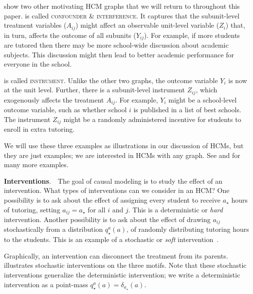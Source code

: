 \documentclass[12pt]{article}
\newcommand{\parhead}[1]{\vspace{0.1in} \noindent \textbf{#1}. \,\,}
\begin{document}
 
 show two other motivating HCM graphs that we will return to throughout this paper.  is called \textsc{confounder \& interference}. It captures that the subunit-level treatment variables ($A_{ij}$) might affect an observable unit-level variable ($Z_i$) that, in turn, affects the outcome of all subunits ($Y_{ij}$). For example, if more students are tutored then there may be more school-wide discussion about academic subjects. This discussion might then lead to better academic performance for everyone in the school.





 is called \textsc{instrument}. Unlike the other two graphs, the outcome variable $Y_i$ is now at the unit level. Further, there is a subunit-level instrument $Z_{ij}$, which exogenously affects the treatment $A_{ij}$. For example, $Y_i$ might be a school-level outcome variable, such as whether school $i$ is published in a list of best schools. The instrument $Z_{ij}$ might be a randomly administered incentive for students to enroll in extra tutoring.





We will use these three examples as illustrations in our discussion of HCMs, but they are just examples;
we are interested in HCMs with any graph. See  and  for many more examples.

\parhead{Interventions} The goal of causal modeling is to study the effect of an intervention. What types of interventions can we consider in an HCM?  One possibility is to ask about the effect of assigning every student to receive $a_\star$ hours of tutoring, setting $a_{ij} = a_\star$ for all $i$ and $j$.  This is a deterministic or \textit{hard} intervention. Another possibility is to ask about the effect of drawing $a_{ij}$ stochastically from a distribution $q_\star^a(a)$, of randomly distributing tutoring hours to the students.  This is an example of a stochastic or \textit{soft} intervention~\citep[Chap. 4][]{Pearl2009-fh,Dawid2002-yq,Correa2020-df}.



Graphically, an intervention can disconnect the treatment from its parents.  illustrates stochastic interventions on the three motifs.  Note that these stochastic interventions generalize the deterministic intervention; we write a deterministic intervention as a point-mass $q_\star^a(a) = \delta_{a_\star}(a)$.
\end{document}
